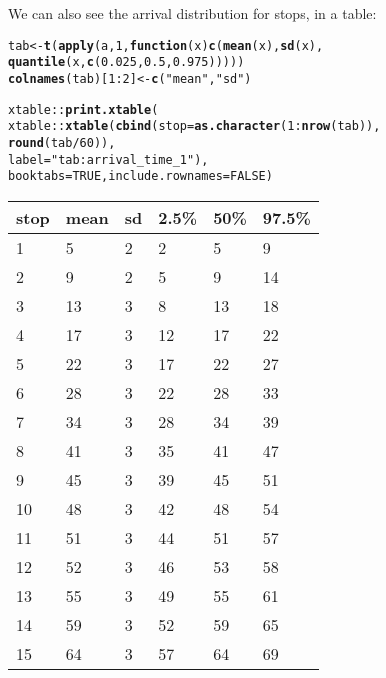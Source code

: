\documentclass[11pt]{article}\usepackage[]{graphicx}\usepackage[]{color}
\makeatletter
\newcommand{\hlnum}[1]{\textcolor[rgb]{0.686,0.059,0.569}{#1}}%
\newcommand{\hlstr}[1]{\textcolor[rgb]{0.192,0.494,0.8}{#1}}%
\newcommand{\hlopt}[1]{\textcolor[rgb]{0,0,0}{#1}}%
\newcommand{\hlstd}[1]{\textcolor[rgb]{0.345,0.345,0.345}{#1}}%
\newcommand{\hlkwa}[1]{\textcolor[rgb]{0.161,0.373,0.58}{\textbf{#1}}}%
\newcommand{\hlkwb}[1]{\textcolor[rgb]{0.69,0.353,0.396}{#1}}%
\newcommand{\hlkwc}[1]{\textcolor[rgb]{0.333,0.667,0.333}{#1}}%
\newcommand{\hlkwd}[1]{\textcolor[rgb]{0.737,0.353,0.396}{\textbf{#1}}}%
\newenvironment{kframe}{%
 \def\at@end@of@kframe{}%
 \ifinner\ifhmode%
  \def\at@end@of@kframe{\end{minipage}}%
  \begin{minipage}{\columnwidth}%
 \fi\fi%
 \def\FrameCommand##1{\hskip\@totalleftmargin \hskip-\fboxsep
 \colorbox{shadecolor}{##1}\hskip-\fboxsep
     \hskip-\linewidth \hskip-\@totalleftmargin \hskip\columnwidth}%
 \MakeFramed {\advance\hsize-\width
   \@totalleftmargin\z@ \linewidth\hsize
   \@setminipage}}%
 {\par\unskip\endMakeFramed%
 \at@end@of@kframe}
\makeatother
\begin{document}
We can also see the arrival distribution for stops, in a table:
\begin{kframe}
\begin{alltt}
\hlstd{tab} \hlkwb{<-} \hlkwd{t}\hlstd{(}\hlkwd{apply}\hlstd{(a,} \hlnum{1}\hlstd{,} \hlkwa{function}\hlstd{(}\hlkwc{x}\hlstd{)} \hlkwd{c}\hlstd{(}\hlkwd{mean}\hlstd{(x),} \hlkwd{sd}\hlstd{(x),}
                                   \hlkwd{quantile}\hlstd{(x,} \hlkwd{c}\hlstd{(}\hlnum{0.025}\hlstd{,} \hlnum{0.5}\hlstd{,} \hlnum{0.975}\hlstd{)))))}
\hlkwd{colnames}\hlstd{(tab)[}\hlnum{1}\hlopt{:}\hlnum{2}\hlstd{]} \hlkwb{<-} \hlkwd{c}\hlstd{(}\hlstr{"mean"}\hlstd{,} \hlstr{"sd"}\hlstd{)}

\hlstd{xtable}\hlopt{::}\hlkwd{print.xtable}\hlstd{(}
    \hlstd{xtable}\hlopt{::}\hlkwd{xtable}\hlstd{(}\hlkwd{cbind}\hlstd{(}\hlkwc{stop} \hlstd{=} \hlkwd{as.character}\hlstd{(}\hlnum{1}\hlopt{:}\hlkwd{nrow}\hlstd{(tab)),}
                         \hlkwd{round}\hlstd{(tab} \hlopt{/} \hlnum{60}\hlstd{)),}
                   \hlkwc{label} \hlstd{=} \hlstr{"tab:arrival_time_1"}\hlstd{),}
    \hlkwc{booktabs} \hlstd{=} \hlnum{TRUE}\hlstd{,} \hlkwc{include.rownames} \hlstd{=} \hlnum{FALSE}\hlstd{)}
\end{alltt}
\end{kframe}%
\begin{table}[ht]
\centering
\begin{tabular}{llllll}
  \toprule
stop & mean & sd & 2.5\% & 50\% & 97.5\% \\ 
  \midrule
1 & 5 & 2 & 2 & 5 & 9 \\ 
  2 & 9 & 2 & 5 & 9 & 14 \\ 
  3 & 13 & 3 & 8 & 13 & 18 \\ 
  4 & 17 & 3 & 12 & 17 & 22 \\ 
  5 & 22 & 3 & 17 & 22 & 27 \\ 
  6 & 28 & 3 & 22 & 28 & 33 \\ 
  7 & 34 & 3 & 28 & 34 & 39 \\ 
  8 & 41 & 3 & 35 & 41 & 47 \\ 
  9 & 45 & 3 & 39 & 45 & 51 \\ 
  10 & 48 & 3 & 42 & 48 & 54 \\ 
  11 & 51 & 3 & 44 & 51 & 57 \\ 
  12 & 52 & 3 & 46 & 53 & 58 \\ 
  13 & 55 & 3 & 49 & 55 & 61 \\ 
  14 & 59 & 3 & 52 & 59 & 65 \\ 
  15 & 64 & 3 & 57 & 64 & 69 \\ 
   \bottomrule
\end{tabular}
\label{tab:arrival_time_1}
\end{table}
\end{document}
